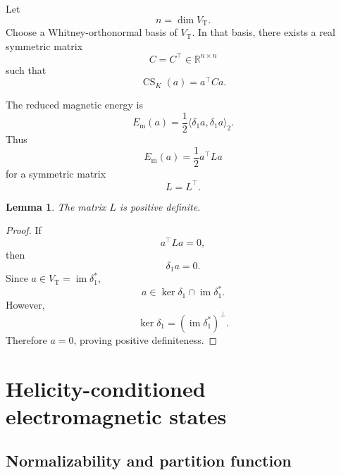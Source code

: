 \documentclass[11pt]{article}
\newtheorem{lemma}[theorem]{Lemma}
\theoremstyle{definition}
\theoremstyle{remark}
\newcommand{\R}{\mathbb{R}}
\newcommand{\im}{\operatorname{im}}
\newcommand{\CS}{\operatorname{CS}}
\begin{document}
Let
\begin{equation}
n=\dim V_{\mathrm T}.
\end{equation}
Choose a Whitney-orthonormal basis of \(V_{\mathrm T}\). In
that basis, there exists a real symmetric matrix
\begin{equation}
C=C^\top\in\R^{n\times n}
\end{equation}
such that
\begin{equation}
\CS_K(a)
=
a^\top Ca.
\label{eq:matrix-cs}
\end{equation}

The reduced magnetic energy is
\begin{equation}
E_{\mathrm m}(a)
=
\frac12
\langle\delta_1a,\delta_1a\rangle_2.
\label{eq:magnetic-energy}
\end{equation}
Thus
\begin{equation}
E_{\mathrm m}(a)
=
\frac12a^\top La
\label{eq:matrix-energy}
\end{equation}
for a symmetric matrix
\begin{equation}
L=L^\top.
\end{equation}

\begin{lemma}
\label{lem:positive}
The matrix \(L\) is positive definite.
\end{lemma}

\begin{proof}
If
\begin{equation}
a^\top La=0,
\end{equation}
then
\begin{equation}
\delta_1a=0.
\end{equation}
Since \(a\in V_{\mathrm T}=\im\delta_1^\ast\),
\begin{equation}
a\in
\ker\delta_1\cap\im\delta_1^\ast.
\end{equation}
However,
\begin{equation}
\ker\delta_1
=
(\im\delta_1^\ast)^\perp.
\end{equation}
Therefore \(a=0\), proving positive definiteness.
\end{proof}

\section{Helicity-conditioned electromagnetic states}

\subsection{Normalizability and partition function}
\end{document}
